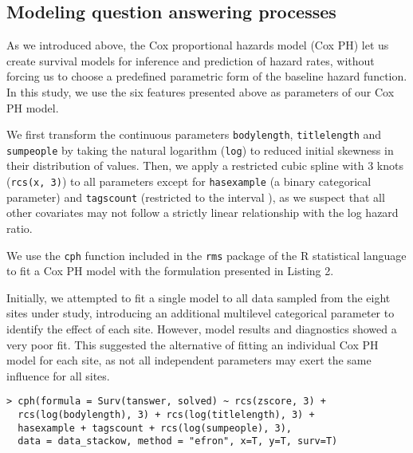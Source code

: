 \documentclass{chi2012}
\begin{document}
\subsection{Modeling question answering processes}

As we introduced above, the Cox proportional hazards model (Cox PH) let us create
survival models for inference and prediction of hazard rates, without forcing us
to choose a predefined parametric form of the baseline hazard function. In this
study, we use the six features presented above as parameters of our Cox PH model. 

We first transform the continuous parameters
\texttt{bodylength}, \texttt{titlelength} and \texttt{sumpeople} by taking the natural 
logarithm (\texttt{log}) to reduced initial skewness in their distribution of values.
Then, we apply a restricted cubic spline with 3 knots (\texttt{rcs(x, 3)}) to all
parameters except for \texttt{hasexample} (a binary categorical parameter) and
\texttt{tagscount} (restricted to the interval ), as we suspect that all
other covariates may not follow a strictly linear relationship with the log hazard
ratio.

We use the \texttt{cph} function included in the \texttt{rms} package
of the R statistical language to fit a Cox PH model with the 
formulation presented in Listing 2.

Initially, we attempted to fit a single model to all data sampled from the eight sites under study, introducing an additional multilevel categorical parameter to
identify the effect of each site. However, model results and diagnostics showed
a very poor fit. This suggested the alternative of fitting an individual Cox PH
model for each site, as not all independent parameters may exert the same influence
for all sites.

\begin{lstlisting}[breaklines=true,
caption={Model formulation to fit a Cox PH model for each site using the 
\texttt{cph} function in the \texttt{rms} package in R.},
basicstyle=\ttfamily\scriptsize,
frame=lines,
showtabs=false,
showspaces=false,
showstringspaces=false,
captionpos=b]
> cph(formula = Surv(tanswer, solved) ~ rcs(zscore, 3) +
  rcs(log(bodylength), 3) + rcs(log(titlelength), 3) + 
  hasexample + tagscount + rcs(log(sumpeople), 3),
  data = data_stackow, method = "efron", x=T, y=T, surv=T)
\end{lstlisting}
\end{document}
